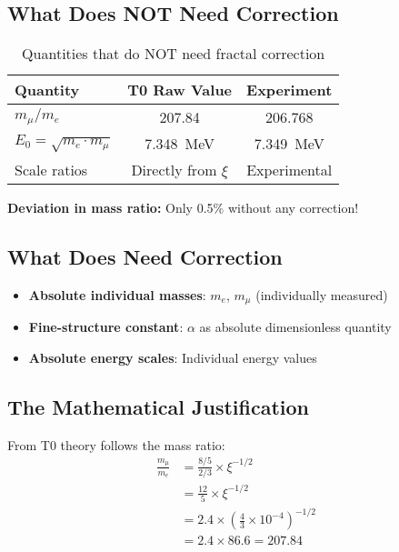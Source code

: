 \documentclass[12pt,a4paper]{article}
\theoremstyle{definition}
\begin{document}
	\subsection{What Does NOT Need Correction}
	
	\begin{table}[h]
		\centering
		\begin{tabular}{@{}lcc@{}}
			\toprule
			\textbf{Quantity} & \textbf{T0 Raw Value} & \textbf{Experiment} \\
			\midrule
			$m_\mu/m_e$ & 207.84 & 206.768 \\
			$E_0 = \sqrt{m_e \cdot m_\mu}$ & \SI{7.348}{\MeV} & \SI{7.349}{\MeV} \\
			Scale ratios & Directly from $\xi$ & Experimental \\
			\bottomrule
		\end{tabular}
		\caption{Quantities that do NOT need fractal correction}
	\end{table}
	
	\textbf{Deviation in mass ratio:} Only 0.5\% without any correction!
	
	\subsection{What Does Need Correction}
	
	\begin{itemize}
		\item \textbf{Absolute individual masses}: $m_e$, $m_\mu$ (individually measured)
		\item \textbf{Fine-structure constant}: $\alpha$ as absolute dimensionless quantity
		\item \textbf{Absolute energy scales}: Individual energy values
	\end{itemize}
	
	\subsection{The Mathematical Justification}
	
	From T0 theory follows the mass ratio:
	\begin{align}
		\frac{m_\mu}{m_e} &= \frac{8/5}{2/3} \times \xi^{-1/2} \\
		&= \frac{12}{5} \times \xi^{-1/2} \\
		&= 2.4 \times \left(\frac{4}{3} \times 10^{-4}\right)^{-1/2} \\
		&= 2.4 \times 86.6 = 207.84
	\end{align}
	
\end{document}
